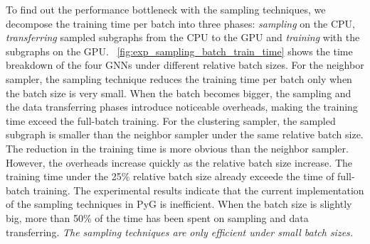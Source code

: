 To find out the performance bottleneck with the sampling techniques, we decompose the training time per batch into three phases: \emph{sampling} on the CPU, \emph{transferring} sampled subgraphs from the CPU to the GPU and \emph{training} with the subgraphs on the GPU.
\figurename~\ref{fig:exp_sampling_batch_train_time} shows the time breakdown of the four GNNs under different relative batch sizes.
For the neighbor sampler, the sampling technique reduces the training time per batch only when the batch size is very small.
When the batch becomes bigger, the sampling and the data transferring phases introduce noticeable overheads, making the training time exceed the full-batch training.
For the clustering sampler, the sampled subgraph is smaller than the neighbor sampler under the same relative batch size.
The reduction in the training time is more obvious than the neighbor sampler.
However, the overheads increase quickly as the relative batch size increase.
The training time under the 25\% relative batch size already exceede the time of full-batch training.
The experimental results indicate that the current implementation of the sampling techniques in PyG is inefficient.
When the batch size is slightly big, more than 50\% of the time has been spent on sampling and data transferring.
\emph{The sampling techniques are only efficient under small batch sizes.}

